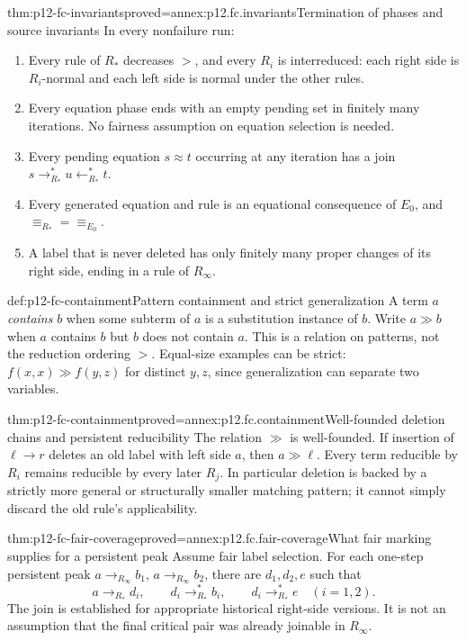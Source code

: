 \begin{hblemma}{thm:p12-fc-invariants}{proved=annex:p12.fc.invariants}{Termination of phases and source invariants}
In every nonfailure run:
\begin{enumerate}
\item Every rule of \(R_*\) decreases \(>\), and every \(R_i\)
      is interreduced: each right side is \(R_i\)-normal and each
      left side is normal under the other rules.
\item Every equation phase ends with an empty pending set in finitely
      many iterations. No fairness assumption on equation selection
      is needed.
\item Every pending equation \(s\approx t\) occurring at any
      iteration has a join \(s\to_{R_*}^*u\leftarrow_{R_*}^*t\).
\item Every generated equation and rule is an equational consequence
      of \(E_0\), and \(\equiv_{R_*}=\equiv_{E_0}\).
\item A label that is never deleted has only finitely many proper
      changes of its right side, ending in a rule of \(R_\infty\).
\end{enumerate}
\end{hblemma}

\begin{hbdefinition}{def:p12-fc-containment}{Pattern containment and strict generalization}
A term \(a\) \emph{contains} \(b\) when some subterm of \(a\)
is a substitution instance of \(b\). Write \(a\gg b\) when
\(a\) contains \(b\) but \(b\) does not contain \(a\).
This is a relation on patterns, not the reduction ordering \(>\).
Equal-size examples can be strict: \(f(x,x)\gg f(y,z)\) for
distinct \(y,z\), since generalization can separate two variables.
\end{hbdefinition}

\begin{hblemma}{thm:p12-fc-containment}{proved=annex:p12.fc.containment}{Well-founded deletion chains and persistent reducibility}
The relation \(\gg\) is well-founded. If insertion of \(\ell\to r\)
deletes an old label with left side \(a\), then \(a\gg\ell\).
Every term reducible by \(R_i\) remains reducible by every later
\(R_j\). In particular deletion is backed by a strictly more general
or structurally smaller matching pattern; it cannot simply discard
the old rule's applicability.
\end{hblemma}

\begin{hblemma}{thm:p12-fc-fair-coverage}{proved=annex:p12.fc.fair-coverage}{What fair marking supplies for a persistent peak}
Assume fair label selection. For each one-step persistent peak
\(a\to_{R_\infty}b_1\), \(a\to_{R_\infty}b_2\), there are
\(d_1,d_2,e\) such that
\[
 a\to_{R_*}d_i,\qquad d_i\to_{R_*}^*b_i,
 \qquad d_i\to_{R_*}^*e\quad(i=1,2).
\]
The join is established for appropriate historical right-side versions.
It is not an assumption that the final critical pair was already
joinable in \(R_\infty\).
\end{hblemma}

